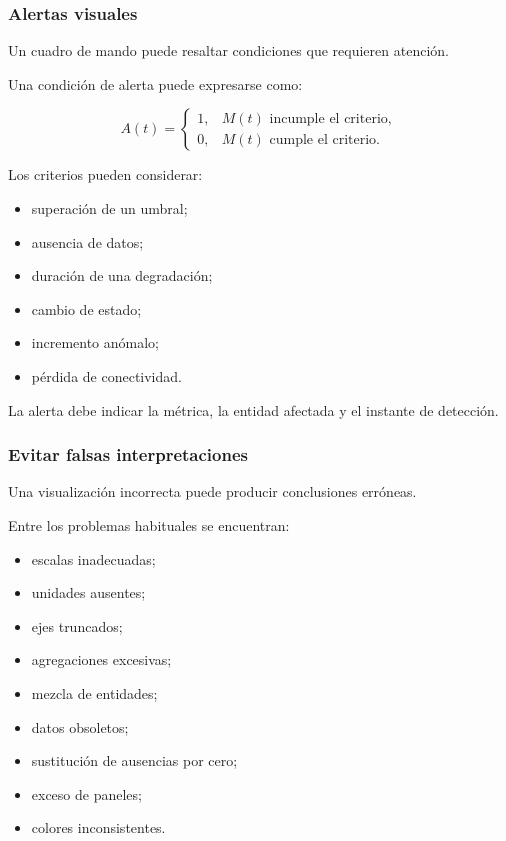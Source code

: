 \subsubsection*{Alertas visuales}

Un cuadro de mando puede resaltar condiciones que requieren atención.

Una condición de alerta puede expresarse como:

\[
    A(t)
    =
    \begin{cases}
        1, & M(t) \text{ incumple el criterio},\\
        0, & M(t) \text{ cumple el criterio}.
    \end{cases}
\]

Los criterios pueden considerar:

\begin{itemize}
    \item superación de un umbral;

    \item ausencia de datos;

    \item duración de una degradación;

    \item cambio de estado;

    \item incremento anómalo;

    \item pérdida de conectividad.
\end{itemize}

La alerta debe indicar la métrica, la entidad afectada y el instante de
detección.


\subsubsection*{Evitar falsas interpretaciones}

Una visualización incorrecta puede producir conclusiones erróneas.

Entre los problemas habituales se encuentran:

\begin{itemize}
    \item escalas inadecuadas;

    \item unidades ausentes;

    \item ejes truncados;

    \item agregaciones excesivas;

    \item mezcla de entidades;

    \item datos obsoletos;

    \item sustitución de ausencias por cero;

    \item exceso de paneles;

    \item colores inconsistentes.
\end{itemize}

